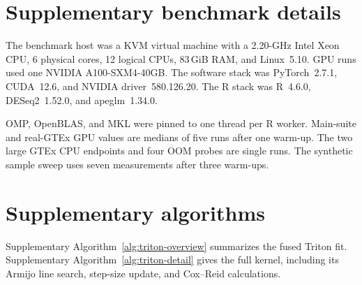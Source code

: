 \documentclass[12pt]{article}
\begin{document}
\section*{Supplementary benchmark details}
The benchmark host was a KVM virtual machine with a 2.20-GHz Intel Xeon CPU,
6 physical cores, 12 logical CPUs, 83\,GiB RAM, and Linux~5.10. GPU runs used
one NVIDIA A100-SXM4-40GB. The software stack was PyTorch~2.7.1, CUDA~12.6,
and NVIDIA driver~580.126.20. The R stack was R~4.6.0, DESeq2~1.52.0, and
apeglm~1.34.0.

OMP, OpenBLAS, and MKL were pinned to one thread per R worker. Main-suite and
real-GTEx GPU values are medians of five runs after one warm-up. The two large
GTEx CPU endpoints and four OOM probes are single runs. The synthetic sample
sweep uses seven measurements after three warm-ups.

\section*{Supplementary algorithms}
\label{sec:supplementary}

Supplementary Algorithm~\ref{alg:triton-overview} summarizes the fused Triton
fit. Supplementary Algorithm~\ref{alg:triton-detail} gives the full kernel,
including its Armijo line search, step-size update, and Cox--Reid calculations.



\end{document}
